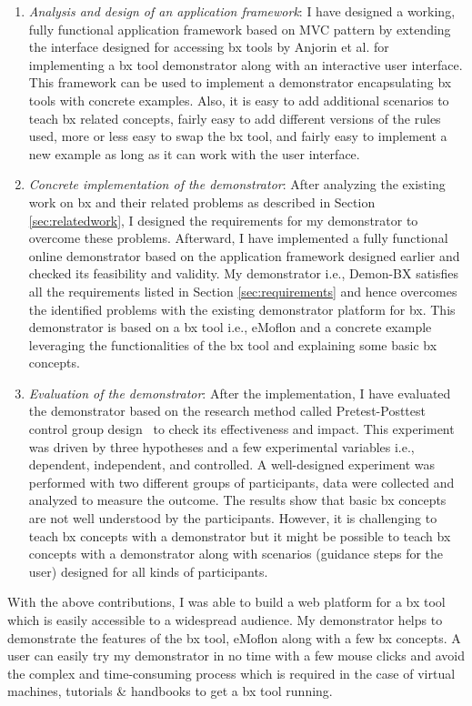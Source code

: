 \begin{enumerate}
	\item {\textit{Analysis and design of an application framework}: I have designed a working, fully functional application framework based on MVC pattern by extending the interface designed for accessing bx tools by Anjorin et al. \cite{benchmarx-reload} for implementing a bx tool demonstrator along with an interactive user interface. This framework can be used to implement a demonstrator encapsulating bx tools with concrete examples. Also, it is easy to add additional scenarios to teach bx related concepts, fairly easy to add different versions of the rules used, more or less easy to swap the bx tool, and fairly easy to implement a new example as long as it can work with the user interface.}
    \item {\textit{Concrete implementation of the demonstrator}: After analyzing the existing work on bx and their related problems as described in Section \ref{sec:relatedwork}, I designed the requirements for my demonstrator to overcome these problems. Afterward, I have implemented a fully functional online demonstrator based on the application framework designed earlier and checked its feasibility and validity. My demonstrator i.e., Demon-BX satisfies all the requirements listed in Section \ref{sec:requirements} and hence overcomes the identified problems with the existing demonstrator platform for bx. This demonstrator is based on a bx tool i.e., eMoflon and a concrete example leveraging the functionalities of the bx tool and explaining some basic bx concepts.}
    \item {\textit{Evaluation of the demonstrator}: After the implementation, I have evaluated the demonstrator based on the research method called Pretest-Posttest control group design~\cite{expandquasiexpdesign} to check its effectiveness and impact. This experiment was driven by three hypotheses and a few experimental variables i.e., dependent, independent, and controlled. A well-designed experiment was performed with two different groups of participants, data were collected and analyzed to measure the outcome. The results show that basic bx concepts are not well understood by the participants. However, it is challenging to teach bx concepts with a demonstrator but it might be possible to teach bx concepts with a demonstrator along with scenarios (guidance steps for the user) designed for all kinds of participants.}	
\end{enumerate}

With the above contributions, I was able to build a web platform for a bx tool which is easily accessible to a widespread audience. My demonstrator helps to demonstrate the features of the bx tool, eMoflon along with a few bx concepts. A user can easily try my demonstrator in no time with a few mouse clicks and avoid the complex and time-consuming process which is required in the case of virtual machines, tutorials \& handbooks to get a bx tool running. 

